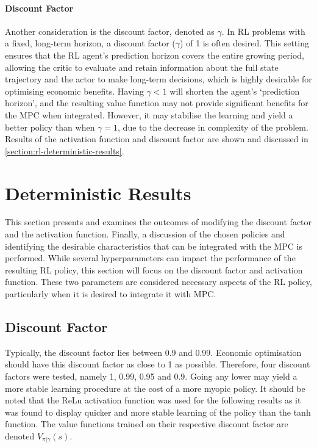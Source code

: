 \paragraph{Discount Factor} 
Another consideration is the discount factor, denoted as $\gamma$. In RL problems with a fixed, long-term horizon, a discount factor ($\gamma$) of 1 is often desired. This setting ensures that the RL agent's prediction horizon covers the entire growing period, allowing the critic to evaluate and retain information about the full state trajectory and the actor to make long-term decisions, which is highly desirable for optimising economic benefits. Having $\gamma < 1$ will shorten the agent’s ‘prediction horizon’, and the resulting value function may not provide significant benefits for the MPC when integrated. However, it may stabilise the learning and yield a better policy than when $\gamma = 1$, due to the decrease in complexity of the problem. Results of the activation function and discount factor are shown and discussed in \autoref{section:rl-deterministic-results}.

\section{Deterministic Results}
This section presents and examines the outcomes of modifying the discount factor and the activation function. Finally, a discussion of the chosen policies and identifying the desirable characteristics that can be integrated with the MPC is performed. While several hyperparameters can impact the performance of the resulting RL policy, this section will focus on the discount factor and activation function. These two parameters are considered necessary aspects of the RL policy, particularly when it is desired to integrate it with MPC.

\subsection{Discount Factor}\label{ssection:discount-factor}
Typically, the discount factor lies between 0.9 and 0.99. Economic optimisation should have this discount factor as close to 1 as possible. Therefore, four discount factors were tested, namely 1, 0.99, 0.95 and 0.9. Going any lower may yield a more stable learning procedure at the cost of a more myopic policy. It should be noted that the ReLu activation function was used for the following results as it was found to display quicker and more stable learning of the policy than the tanh function. The value functions trained on their respective discount factor are denoted $V_{\pi|\gamma}(s)$.


